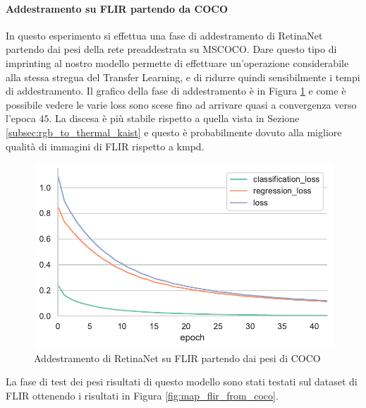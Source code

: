 \paragraph{Addestramento su FLIR partendo da COCO}
In questo esperimento si effettua una fase di addestramento di RetinaNet partendo dai pesi della rete preaddestrata su \ac{MSCOCO}. Dare questo tipo di imprinting al nostro modello permette di effettuare un'operazione considerabile alla stessa stregua del Transfer Learning, e di ridurre quindi sensibilmente i tempi di addestramento. Il grafico della fase di addestramento è in Figura \ref{fig:train_from_coco_FLIR} e come è possibile vedere le varie loss sono scese fino ad arrivare quasi a convergenza verso l'epoca $45$. La discesa è più stabile rispetto a quella vista in Sezione \ref{subsec:rgb_to_thermal_kaist} e questo è probabilmente dovuto alla migliore qualità di immagini di FLIR rispetto a \ac{kmpd}.  
\begin{figure}[]
    \centering
    \includegraphics[width = \textwidth]{images/graphic/train_flir_from_coco.pdf}
    \caption{Addestramento di RetinaNet su FLIR partendo dai pesi di COCO}
    \label{fig:train_from_coco_FLIR}
\end{figure}
La fase di test dei pesi risultati di questo modello sono stati testati sul dataset di FLIR ottenendo i risultati in Figura \ref{fig:map_flir_from_coco}. 
